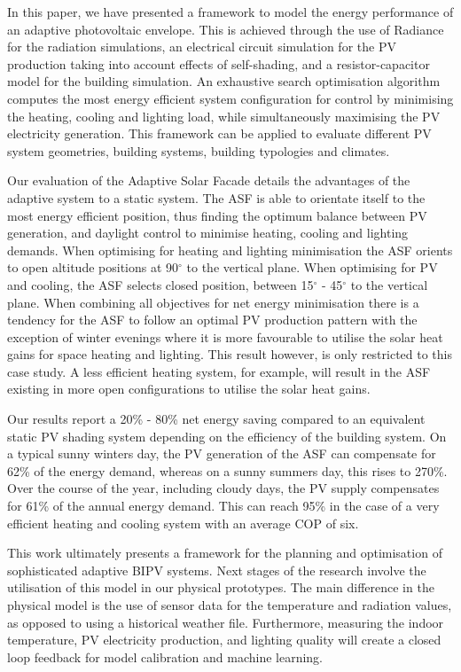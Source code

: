 
In this paper, we have presented a framework to model the energy performance of an adaptive photovoltaic envelope. This is achieved through the use of Radiance for the radiation simulations, an electrical circuit simulation for the PV production taking into account effects of self-shading, and a resistor-capacitor model for the building simulation. An exhaustive search optimisation algorithm computes the most energy efficient system configuration for control by minimising the heating, cooling and lighting load, while simultaneously maximising the PV electricity generation. This framework can be applied to evaluate different PV system geometries, building systems, building typologies and climates.

Our evaluation of the Adaptive Solar Facade details the advantages of the adaptive system to a static system. The ASF is able to orientate itself to the most energy efficient position, thus finding the optimum balance between PV generation, and daylight control to minimise heating, cooling and lighting demands. When optimising for heating and lighting minimisation the ASF orients to open altitude positions at 90$^{\circ}$ to the vertical plane. When optimising for PV and cooling, the ASF selects closed position, between 15$^{\circ}$ - 45$^{\circ}$ to the vertical plane. When combining all objectives for net energy minimisation there is a tendency for the ASF to follow an optimal PV production pattern with the exception of winter evenings where it is more favourable to utilise the solar heat gains for space heating and lighting. This result however, is only restricted to this case study. A less efficient heating system, for example, will result in the ASF existing in more open configurations to utilise the solar heat gains.


Our results report a 20\% - 80\% net energy saving compared to an equivalent static PV shading system depending on the efficiency of the building system. On a typical sunny winters day, the PV generation of the ASF can compensate for 62\% of the energy demand, whereas on a sunny summers day, this rises to 270\%. Over the course of the year, including cloudy days, the PV supply compensates for 61\% of the annual energy demand. This can reach 95\% in the case of a very efficient heating and cooling system with an average COP of six.

This work ultimately presents a framework for the planning and optimisation of sophisticated adaptive BIPV systems. Next stages of the research involve the utilisation of this model in our physical prototypes. The main difference in the physical model is the use of sensor data for the temperature and radiation values, as opposed to using a historical weather file. Furthermore, measuring the indoor temperature, PV electricity production, and lighting quality will create a closed loop feedback for model calibration and machine learning. 


